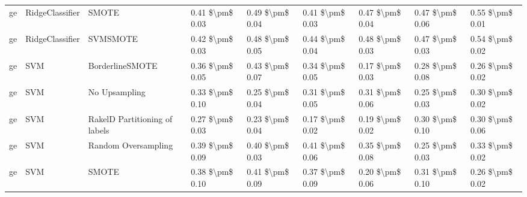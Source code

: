 \begin{tabular}{lllllllll}
      ge &                 RidgeClassifier &                         SMOTE & 0.41 \$\textbackslash pm\$ 0.03 &           0.49 \$\textbackslash pm\$ 0.04 &       0.41 \$\textbackslash pm\$ 0.03 &        0.47 \$\textbackslash pm\$ 0.04 &                         0.47 \$\textbackslash pm\$ 0.06 &     0.55 \$\textbackslash pm\$ 0.01 \\
      ge &                 RidgeClassifier &                      SVMSMOTE & 0.42 \$\textbackslash pm\$ 0.03 &           0.48 \$\textbackslash pm\$ 0.05 &       0.44 \$\textbackslash pm\$ 0.04 &        0.48 \$\textbackslash pm\$ 0.03 &                         0.47 \$\textbackslash pm\$ 0.03 &     0.54 \$\textbackslash pm\$ 0.02 \\
      ge &                             SVM &               BorderlineSMOTE & 0.36 \$\textbackslash pm\$ 0.05 &           0.43 \$\textbackslash pm\$ 0.07 &       0.34 \$\textbackslash pm\$ 0.05 &        0.17 \$\textbackslash pm\$ 0.03 &                         0.28 \$\textbackslash pm\$ 0.08 &     0.26 \$\textbackslash pm\$ 0.02 \\
      ge &                             SVM &                 No Upsampling & 0.33 \$\textbackslash pm\$ 0.10 &           0.25 \$\textbackslash pm\$ 0.04 &       0.31 \$\textbackslash pm\$ 0.05 &        0.31 \$\textbackslash pm\$ 0.06 &                         0.25 \$\textbackslash pm\$ 0.03 &     0.30 \$\textbackslash pm\$ 0.02 \\
      ge &                             SVM & RakelD Partitioning of labels & 0.27 \$\textbackslash pm\$ 0.03 &           0.23 \$\textbackslash pm\$ 0.04 &       0.17 \$\textbackslash pm\$ 0.02 &        0.19 \$\textbackslash pm\$ 0.02 &                         0.30 \$\textbackslash pm\$ 0.10 &     0.30 \$\textbackslash pm\$ 0.06 \\
      ge &                             SVM &           Random Oversampling & 0.39 \$\textbackslash pm\$ 0.09 &           0.40 \$\textbackslash pm\$ 0.03 &       0.41 \$\textbackslash pm\$ 0.06 &        0.35 \$\textbackslash pm\$ 0.08 &                         0.25 \$\textbackslash pm\$ 0.03 &     0.33 \$\textbackslash pm\$ 0.02 \\
      ge &                             SVM &                         SMOTE & 0.38 \$\textbackslash pm\$ 0.10 &           0.41 \$\textbackslash pm\$ 0.09 &       0.37 \$\textbackslash pm\$ 0.09 &        0.20 \$\textbackslash pm\$ 0.06 &                         0.31 \$\textbackslash pm\$ 0.10 &     0.26 \$\textbackslash pm\$ 0.02 \\

\end{tabular}
